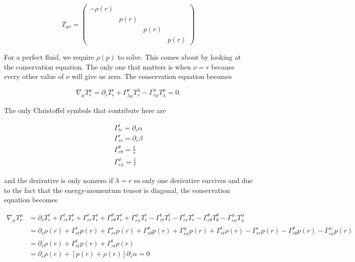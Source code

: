 \documentclass[12pt]{extarticle}
\begin{document}
\begin{equation}
T_{\mu\nu} = 
\begin{pmatrix}
-\rho(r) & & & \\
& p(r) & & \\
& & p(r) & \\
& & & p(r)
\end{pmatrix}
\end{equation}

For a perfect fluid, we require $\rho(p)$ to solve. This comes about by looking at the conservation equation. The only one that matters is when $\nu=r$ because every other value of $\nu$ will give us zero. The conservation equation becomes

\begin{equation}
\nabla_\mu T^\mu_r = \partial_r T^r_r + \Gamma^\mu_{\lambda\mu}T^\lambda_r - \Gamma^\lambda_{r\mu}T^\mu_\lambda =0.
\end{equation}

The only Christoffel symbols that contribute here are 

\begin{subequations}
\begin{align}
\Gamma^t_{tr} = \partial_r\alpha \\
\Gamma^r_{rr} = \partial_r \beta \\
\Gamma^\theta_{r\theta} = \frac{1}{r} \\
\Gamma^\phi_{r\phi} = \frac{1}{r}
\end{align}
\end{subequations}

and the derivative is only nonzero if $\lambda = r$ so only one derivative survives and due to the fact that the energy-momentum tensor is diagonal, the conservation equation becomes

\begin{equation}
\begin{split}
\nabla_\mu T^\mu_\nu &= \partial_r T^r_r + \Gamma^t_{rt}T^r_r + \Gamma^r_{rr}T^r_r + \Gamma^\theta_{r\theta}T^r_r + \Gamma^\phi_{r\phi}T^r_r -\Gamma^t_{rt}T^t_t -\Gamma^r_{rr}T^r_r - \Gamma^\theta_{r\theta}T^\theta_\theta -\Gamma^\phi_{r\phi} T^\phi_\phi \\
& = \partial_r \rho(r) + \Gamma^t_{rt}p(r) + \Gamma^r_{rr}p(r) + \Gamma^\theta_{r\theta}p(r) + \Gamma^\phi_{r\phi}p(r) +\Gamma^t_{rt}\rho(r) -\Gamma^r_{rr}p(r) - \Gamma^\theta_{r\theta}p(r) -\Gamma^\phi_{r\phi} p(r) \\
& = \partial_r \rho(r) + \Gamma^t_{rt}p(r) +\Gamma^t_{rt}\rho(r) \\
& = \partial_r \rho(r) + [p(r)+\rho(r)]\partial_r\alpha = 0
\end{split}
\end{equation}
\end{document}
